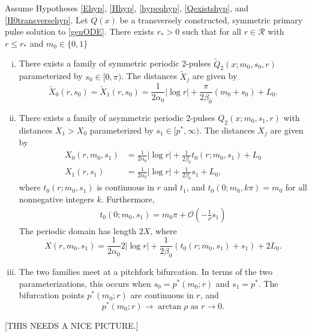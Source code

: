 \documentclass[thesis.tex]{subfiles}
\begin{document}
\begin{theorem}\label{2pulsebifurcation}
Assume Hypotheses \ref{Ehyp}, \ref{Hhyp}, \ref{hypeqhyp}, \ref{Qexistshyp}, and \ref{H0transversehyp}. Let $Q(x)$ be a transversely constructed, symmetric primary pulse solution to \eqref{genODE}. There exists $r_* > 0$ such that for all $r \in \mathcal{R}$ with $r \leq r_*$ and $m_0 \in \{0, 1\}$
\begin{enumerate}[(i)]
	\item There exists a family of symmetric periodic 2-pulses $\tilde{Q}_2(x; m_0, s_0, r)$ parameterized by $s_0 \in [0, \pi)$. The distances $\tilde{X}_j$ are given by
	\begin{equation}\label{2psymmdist}
		\tilde{X}_0(r, s_0) = \tilde{X}_1(r, s_0) = \frac{1}{2 \alpha_0} |\log r| + \frac{\pi}{2\beta_0} (m_0 + s_0) + L_0.
	\end{equation}
	\item There exists a family of asymmetric periodic 2-pulses $Q_2(x; m_0, s_1, r)$ with distances $X_1 > X_0$ parameterized by $s_1 \in [p^*, \infty)$. The distances $X_j$ are given by
	\begin{equation}\label{2pasymmdist}
	\begin{aligned}
		X_0(r, m_0, s_1) &= \frac{1}{2 \alpha_0} |\log r| + \frac{1}{2\beta_0} t_0(r; m_0, s_1) + L_0 \\
		X_1(r, s_1) &= \frac{1}{2 \alpha_0} |\log r| + \frac{1}{2\beta_0} s_1 + L_0, 
	\end{aligned}
	\end{equation}
	where $t_0(r; m_0, s_1)$ is continuous in $r$ and $t_1$, and $t_0(0; m_0, k \pi) = m_0$ for all nonnegative integers $k$. Furthermore,
	\begin{align}\label{deft0}
	t_0(0; m_0, s_1) = m_0 \pi + \mathcal{O}\left(-\frac{1}{\rho} s_1 \right)
	\end{align}
	The periodic domain has length $2X$, where
	\begin{equation}\label{X2pdomain}
	X(r, m_0, s_1) = \frac{1}{2 \alpha_0} 2 |\log r| + \frac{1}{2\beta_0} \left( t_0(r; m_0, s_1) + s_1\right) + 2 L_0.
	\end{equation}

	\item The two families meet at a pitchfork bifurcation. In terms of the two parameterizations, this occurs when $s_0 = p^*(m_0; r)$ and $s_1 = p^*$. The bifurcation points $p^*(m_0; r)$ are continuous in $r$, and
	\[
	p^*(m_0; r) \rightarrow \arctan \rho \text{ as }r \rightarrow 0.
	\]
\end{enumerate}
\end{theorem}
[THIS NEEDS A NICE PICTURE.]
\end{document}
